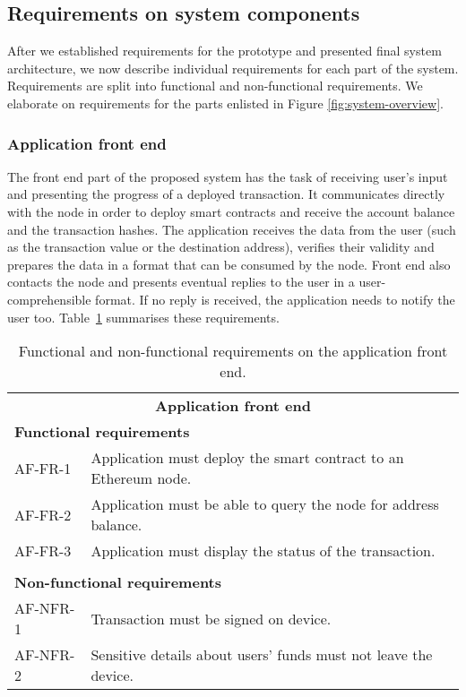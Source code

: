 \subsection{Requirements on system components}\label{sec:component-reqs}

After we established requirements for the prototype and presented final system architecture, we now describe individual requirements for each part of the system. Requirements are split into functional and non-functional requirements. We elaborate on requirements for the parts enlisted in Figure \ref{fig:system-overview}.

\subsubsection{Application front end}\label{sec:app-front-reqs}
The front end part of the proposed system has the task of receiving user's input and presenting the progress of a deployed transaction. It communicates directly with the node in order to deploy smart contracts and receive the account balance and the transaction hashes. The application receives the data from the user (such as the transaction value or the destination address), verifies their validity and prepares the data in a format that can be consumed by the node. Front end also contacts the node and presents eventual replies to the user in a user-comprehensible format. If no reply is received, the application needs to notify the user too. Table~\ref{tab:reqs-applicaion} summarises these requirements.

\begin{table}[ht]
    \begin{tabularx}{\textwidth}{|l X|}
    \hline
        \multicolumn{2}{|c|}{\textbf{Application front end}}\\
        \multicolumn{2}{|l|}{\textbf{Functional requirements}}\\
        AF-FR-1&Application must deploy the smart contract to an Ethereum node.\\
        AF-FR-2&Application must be able to query the node for address balance.\\
        AF-FR-3&Application must display the status of the transaction.\\
        &\\
        \multicolumn{2}{|l|}{\textbf{Non-functional requirements}}\\
        AF-NFR-1&Transaction must be signed on device.\\
        AF-NFR-2&Sensitive details about users' funds must not leave the device.\\
    \hline
    \end{tabularx}
   
    \caption{Functional and non-functional requirements on the application front end.}
    \label{tab:reqs-applicaion}
\end{table}

